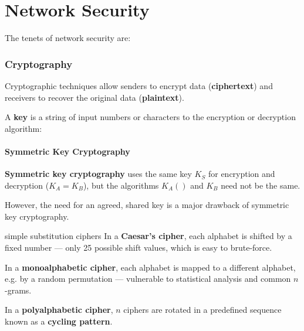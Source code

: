 \part{Network Security}

The tenets of network security are:
\begin{itemize*}
\end{itemize*}

\section{Cryptography}
Cryptographic techniques allow senders to encrypt data (\textbf{ciphertext}) and receivers 
to recover the original data (\textbf{plaintext}).

A \textbf{key} is a string of input numbers or characters to the encryption or decryption algorithm:
\begin{itemize*}
\end{itemize*}

\subsection{Symmetric Key Cryptography}

\textbf{Symmetric key cryptography} uses the same key $K_S$ for encryption and decryption ($K_A = K_B$),
but the algorithms $K_A()$ and $K_B$ need not be the same.

However, the need for an agreed, shared key is a major drawback of symmetric key cryptography.

\begin{defn}{simple substitution ciphers}
    In a \textbf{Caesar's cipher}, each alphabet is shifted by a fixed number ---
    only 25 possible shift values, which is easy to brute-force.

    In a \textbf{monoalphabetic cipher}, each alphabet is mapped to a different alphabet,
    e.g. by a random permutation --- vulnerable to statistical analysis and common $n$-grams.

    In a \textbf{polyalphabetic cipher}, $n$ ciphers are rotated in a predefined sequence known as a \textbf{cycling pattern}.
\end{defn}

